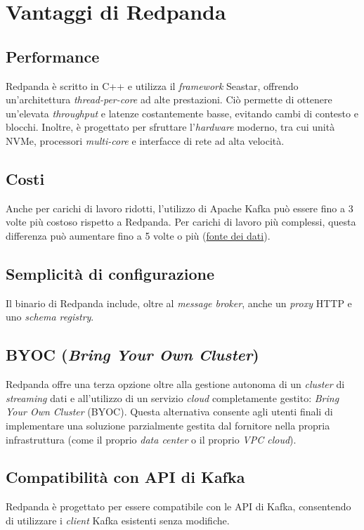\section{Vantaggi di Redpanda}
\subsection{Performance}
Redpanda è scritto in C++ e utilizza il \textit{framework} Seastar, offrendo un'architettura \textit{thread-per-core} ad alte prestazioni.
Ciò permette di ottenere un'elevata \textit{throughput} e latenze costantemente basse, evitando cambi di contesto e blocchi.
Inoltre, è progettato per sfruttare l'\textit{hardware} moderno, tra cui unità NVMe, processori \textit{multi-core} e interfacce di rete ad alta velocità.

\subsection{Costi}
Anche per carichi di lavoro ridotti, l'utilizzo di Apache Kafka può essere fino a 3 volte più costoso rispetto a Redpanda. Per carichi di lavoro più complessi, questa differenza può aumentare fino a 5 volte o più (\href{https://redpanda.com/blog/is-redpanda-better-than-kafka-tco-comparison}{fonte dei dati}).

\subsection{Semplicità di configurazione}
Il binario di Redpanda include, oltre al \textit{message broker}, anche un \textit{proxy} HTTP e uno \textit{schema registry}.

\subsection{BYOC (\textit{Bring Your Own Cluster})}
Redpanda offre una terza opzione oltre alla gestione autonoma di un \textit{cluster} di \textit{streaming}
dati e all'utilizzo di un servizio \textit{cloud} completamente gestito: \textit{Bring Your Own Cluster} (BYOC).
Questa alternativa consente agli utenti finali di implementare una soluzione parzialmente gestita dal fornitore nella propria infrastruttura (come il proprio \textit{data center}
o il proprio \textit{VPC cloud}).

\subsection{Compatibilità con API di Kafka}
Redpanda è progettato per essere compatibile con le API di Kafka, consentendo di utilizzare i \textit{client} Kafka esistenti senza modifiche.

